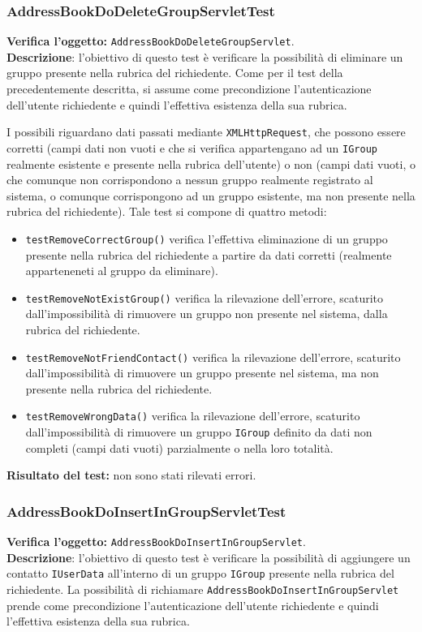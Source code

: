 \subsubsection{AddressBookDoDeleteGroupServletTest}
\textbf{Verifica l'oggetto:} \texttt{AddressBookDoDeleteGroupServlet}.\\
\textbf{Descrizione}: l'obiettivo di questo test è verificare la possibilità di eliminare un gruppo presente nella rubrica del richiedente. Come per il test della  precedentemente descritta, si assume come precondizione l'autenticazione dell'utente richiedente e quindi l'effettiva esistenza della sua rubrica.

I possibili  riguardano dati passati mediante \texttt{XMLHttpRequest}, che possono essere corretti (campi dati non vuoti e che si verifica appartengano ad un \texttt{IGroup} realmente esistente e presente nella rubrica dell'utente) o non (campi dati vuoti, o che comunque non corrispondono a nessun gruppo realmente registrato al sistema, o comunque corrispongono ad un gruppo esistente, ma non presente nella rubrica del richiedente).
Tale test si compone di quattro metodi:
\begin{itemize}
\item \texttt{testRemoveCorrectGroup()} verifica l'effettiva eliminazione di un gruppo presente nella rubrica del richiedente a partire da dati corretti (realmente apparteneneti al gruppo da eliminare).
\item \texttt{testRemoveNotExistGroup()} verifica la rilevazione dell'errore, scaturito dall'impossibilità di rimuovere un gruppo non presente nel sistema, dalla rubrica del richiedente.
\item \texttt{testRemoveNotFriendContact()} verifica la rilevazione dell'errore, scaturito dall'impossibilità di rimuovere un gruppo presente nel sistema, ma non presente nella rubrica del richiedente. 
\item \texttt{testRemoveWrongData()} verifica la rilevazione dell'errore, scaturito dall'impossibilità di rimuovere un gruppo \texttt{IGroup} definito da dati non completi (campi dati vuoti) parzialmente o nella loro totalità.
\end{itemize}
\textbf{Risultato del test:} non sono stati rilevati errori.

\subsubsection{AddressBookDoInsertInGroupServletTest}
\textbf{Verifica l'oggetto:} \texttt{AddressBookDoInsertInGroupServlet}.\\
\textbf{Descrizione}: l'obiettivo di questo test è verificare la possibilità di aggiungere un contatto \texttt{IUserData} all'interno di un gruppo \texttt{IGroup} presente nella rubrica del richiedente. La possibilità di richiamare \texttt{AddressBookDoInsertInGroupServlet} prende come precondizione l'autenticazione dell'utente richiedente e quindi l'effettiva esistenza della sua rubrica.

